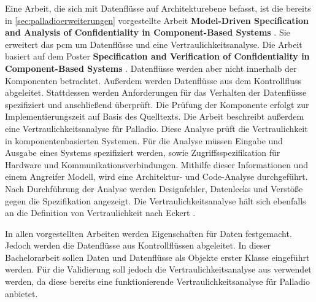 Eine Arbeit, die sich mit Datenflüsse auf Architekturebene befasst, ist die bereits in \autoref{sec:palladioerweiterungen} vorgestellte Arbeit \textbf{Model-Driven Specification and Analysis of Confidentiality in Component-Based Systems} \cite{Kramera}. Sie erweitert das \gls{pcm} um Datenflüsse und eine Vertraulichkeitsanalyse. Die Arbeit basiert auf dem Poster \textbf{Specification and Verification of Confidentiality in Component-Based Systems} \cite{Kramer}. Datenflüsse werden aber nicht innerhalb der Komponenten betrachtet. Außerdem werden Datenflüsse aus dem Kontrollfluss abgeleitet. Stattdessen werden Anforderungen für das Verhalten der Datenflüsse spezifiziert und anschließend überprüft. Die Prüfung der Komponente erfolgt zur Implementierungszeit auf Basis des Quelltexts. Die Arbeit beschreibt außerdem eine Vertraulichkeitsanalyse für Palladio. Diese Analyse prüft die Vertraulichkeit in komponentenbasierten Systemen. Für die Analyse müssen Eingabe und Ausgabe eines Systems spezifiziert werden, sowie Zugriffsspezifikation für Hardware und Kommunikationsverbindungen. Mithilfe dieser Informationen und einem Angreifer Modell, wird eine Architektur- und Code-Analyse durchgeführt. Nach Durchführung der Analyse werden Designfehler, Datenlecks und Verstöße gegen die Spezifikation angezeigt. Die Vertraulichkeitsanalyse hält sich ebenfalls an die Definition von Vertraulichkeit nach Eckert \cite{Eckert2013}. \par
In allen vorgestellten Arbeiten werden Eigenschaften für Daten festgemacht. Jedoch werden die Datenflüsse aus Kontrollflüssen abgeleitet. In dieser Bachelorarbeit sollen Daten und Datenflüsse als Objekte erster Klasse eingeführt werden. Für die Validierung soll jedoch die Vertraulichkeitsanalyse aus \cite{Kramer2012} verwendet werden, da diese bereits eine funktionierende Vertraulichkeitsanalyse für Palladio anbietet.

